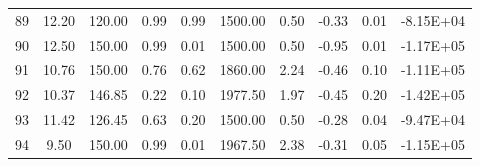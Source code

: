 \begin{landscape}
\begin{center}
\begin{longtable}{|c|c|c|c|c|c|c|c|c|c|}
89 & 12.20 & 120.00 & 0.99 & 0.99 & 1500.00 & 0.50 & -0.33 & 0.01 & -8.15E+04 \\
90 & 12.50 & 150.00 & 0.99 & 0.01 & 1500.00 & 0.50 & -0.95 & 0.01 & -1.17E+05 \\
91 & 10.76 & 150.00 & 0.76 & 0.62 & 1860.00 & 2.24 & -0.46 & 0.10 & -1.11E+05 \\
92 & 10.37 & 146.85 & 0.22 & 0.10 & 1977.50 & 1.97 & -0.45 & 0.20 & -1.42E+05 \\
93 & 11.42 & 126.45 & 0.63 & 0.20 & 1500.00 & 0.50 & -0.28 & 0.04 & -9.47E+04 \\
94 & 9.50  & 150.00 & 0.99 & 0.01 & 1967.50 & 2.38 & -0.31 & 0.05 & -1.15E+05 \\\bottomrule

\end{longtable}
\end{center}
\end{landscape}




